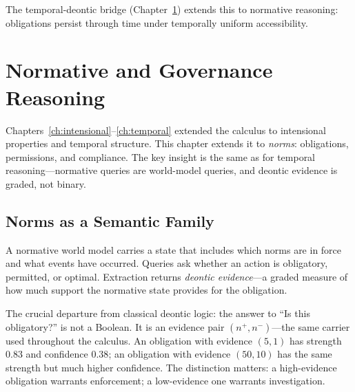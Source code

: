 \documentclass[11pt,openany]{report}
\begin{document}

The temporal-deontic bridge
(Chapter~\ref{ch:governance}) extends this to normative reasoning:
obligations persist through time under temporally uniform
accessibility.



\chapter{Normative and Governance Reasoning}
\label{ch:governance}

Chapters~\ref{ch:intensional}--\ref{ch:temporal} extended the
calculus to intensional properties and temporal structure.  This
chapter extends it to \emph{norms}: obligations, permissions, and
compliance.  The key insight is the same as for temporal reasoning---normative queries are world-model queries, and deontic evidence is
graded, not binary.


\section{Norms as a Semantic Family}

A normative world model carries a state that includes which norms
are in force and what events have occurred.  Queries ask whether an
action is obligatory, permitted, or optimal.  Extraction returns
\emph{deontic evidence}---a graded measure of how much support the
normative state provides for the obligation.

The crucial departure from classical deontic logic: the answer to
``Is this obligatory?'' is not a Boolean.  It is an evidence pair
$(n^+, n^-)$---the same carrier used throughout the calculus.  An
obligation with evidence $(5, 1)$ has strength $0.83$ and confidence
$0.38$; an obligation with evidence $(50, 10)$ has the same strength
but much higher confidence.  The distinction matters: a high-evidence
obligation warrants enforcement; a low-evidence one warrants
investigation.
\end{document}
